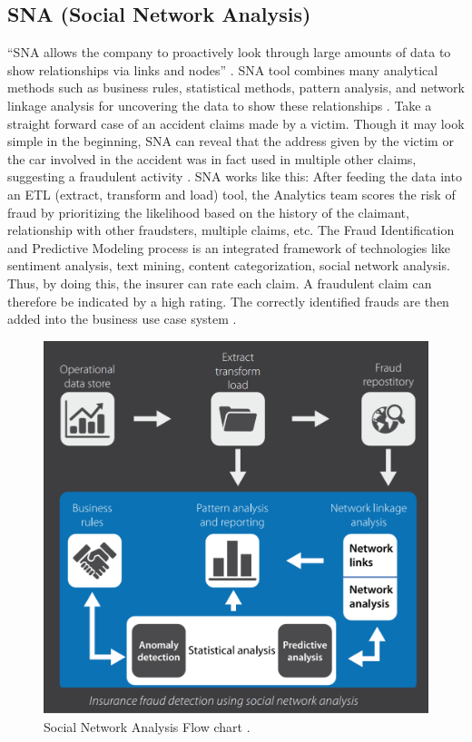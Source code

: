 \documentclass[sigconf]{acmart}
\begin{document}
\subsection{SNA (Social Network Analysis)}
``SNA allows the company to proactively look through large amounts of data to show relationships via links and nodes'' \cite{link9}. SNA tool combines many analytical methods such as business rules, statistical methods, pattern analysis, and network linkage analysis for uncovering the data to show these relationships \cite{link7}. Take a straight forward case of an accident claims made by a victim. Though it may look simple in the beginning, SNA can reveal that the address given by the victim or the car involved in the accident was in fact used in multiple other claims, suggesting a fraudulent activity \cite{link9}. 
SNA works like this: After feeding the data into an ETL (extract, transform and load) tool, the Analytics team scores the risk of fraud by prioritizing the likelihood based on the history of the claimant, relationship with other fraudsters, multiple claims, etc. The Fraud Identification and Predictive Modeling process is an integrated framework of technologies like sentiment analysis, text mining, content categorization, social network analysis. Thus, by doing this, the insurer can rate each claim. A fraudulent claim can therefore be indicated by a high rating. The correctly identified frauds are then added into the business use case system \cite{link9}.
\begin{figure}
  \includegraphics[width=\linewidth]{images/SNA_image1.png}
  \caption{Social Network Analysis Flow chart \cite{link7}.}
  \label{Figure 1:Social Network Analysis flowchart}
\end{figure}
\end{document}
